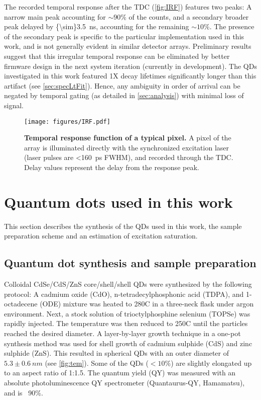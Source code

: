 \documentclass[journal=nalefd, manuscript=letter, layout=twocolumn]{achemso}
\begin{document}
The recorded temporal response after the TDC (\autoref{fig:IRF}) features two peaks: A narrow main peak accounting for ${\sim}90\%$ of the counts, and a secondary broader peak delayed by \SI{{\sim}3.5}{ns}, accounting for the remaining ${\sim}10\%$. The presence of the secondary peak is specific to the particular implementation used in this work, and is not generally evident in similar detector arrays. Preliminary results suggest that this irregular temporal response can be eliminated by better firmware design in the next system iteration (currently in development). The QDs investigated in this work featured 1X decay lifetimes significantly longer than this artifact (see \autoref{sec:specLtFit}). Hence, any ambiguity in order of arrival can be negated by temporal gating (as detailed in \autoref{sec:analysis}) with minimal loss of signal.

\begin{figure}[h]
    \centering
    \texttt{[image: figures/IRF.pdf]}
    \caption{\textbf{Temporal response function of a typical pixel. } A pixel of the array is illuminated directly with the synchronized excitation laser (laser pulses are \SI{<160}{ps} FWHM), and recorded through the TDC. Delay values represent the delay from the response peak.}
    \label{fig:IRF}
\end{figure}

\section{Quantum dots used in this work}
\label{sec:QD}
This section describes the synthesis of the QDs used in this work, the sample preparation scheme and an estimation of excitation saturation.

\subsection{Quantum dot synthesis and sample preparation}
Colloidal CdSe/CdS/ZnS core/shell/shell QDs were synthesized by the following protocol: A cadmium oxide (CdO), n-tetradecylphosphonic acid (TDPA), and 1-octadecene (ODE) mixture was heated to 280\textdegree C in a three-neck flask under argon environment. Next, a stock solution of trioctylphosphine selenium (TOPSe) was rapidly injected. The temperature was then reduced to 250\textdegree C until the particles reached the desired diameter. A layer-by-layer growth technique in a one-pot synthesis method\cite{Li2003} was used for shell growth of cadmium sulphide (CdS) and zinc sulphide (ZnS). This resulted in spherical QDs with an outer diameter of $5.3\pm\SI{0.6}{nm}$ (see \autoref{fig:tem}). Some of the QDs ($<10\%$) are slightly elongated up to an aspect ratio of 1:1.5. The quantum yield (QY) was measured with an absolute photoluminescence QY spectrometer (Quantaurus-QY, Hamamatsu), and is ~90\%.
\end{document}
